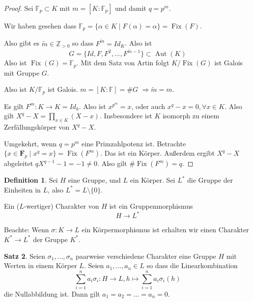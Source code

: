 \documentclass[12pt,parskip=full]{scrartcl}
\newcommand{\setZ}{\mathbb{Z}}
\theoremstyle{definition}
\newtheorem{theorem}{Satz}[section]
\newtheorem{definition}[theorem]{Definition}
\theoremstyle{remark}
\begin{document}
	\begin{proof}
		Sei $\mathbb{F}_p \subset K$ mit $m = [K: \mathbb{F}_p]$ und damit $q = p^m$.
		
		Wir haben gesehen dass $\mathbb{F}_p = \{ \alpha \in K \mid F(\alpha) = \alpha \} = \operatorname{Fix}(F)$.
		
		Also gibt es $\tilde{m} \in \setZ_{>0}$ so dass $F^{\tilde{m}} = Id_K$. Also ist
		\begin{equation*}
			G = \{ Id, F, F^2, \dots, F^{\tilde{m} - 1} \} \subset \operatorname{Aut}(K)
		\end{equation*}
		Also ist $\operatorname{Fix}(G) = \mathbb{F}_p$. Mit dem Satz von Artin folgt $K/\operatorname{Fix}(G)$ ist Galois mit Gruppe $G$.
		
		Also ist $K/\mathbb{F}_p$ ist Galois. $m = [K: \mathbb{F}] = \#G$ $\Rightarrow \tilde{m} = m$.
		
		Es gilt $F^m: K \to K = Id_k$. Also ist $x^{p^m} = x$, oder auch $x^q - x = 0, \forall x \in K$. Also gilt $X^q - X = \prod_{x \in K} (X - x)$. Insbesondere ist $K$ isomorph zu einem Zerfällungskörper von $X^q - X$.
		
		Umgekehrt, wenn $q = p^m$ eine Primzahlpotenz ist. Betrachte $\{ x \in \overline{\mathbf{F}_p} \mid x^q = x \} = \operatorname{Fix}(F^m)$. Das ist ein Körper. Außerdem ergibt $X^q - X$ abgeleitet $q X^{q-1} - 1 = -1 \neq 0$. Also gilt $\#\operatorname{Fix}(F^m) = q$.
	\end{proof}

	\begin{definition}
		Sei $H$ eine Gruppe, und $L$ ein Körper. Sei $L^*$ die Gruppe der Einheiten in $L$, also $L^* = L \setminus \{ 0 \}$.
		
		Ein ($L$-wertiger) Charakter von $H$ ist ein Gruppenmorphismus
		\begin{equation*}
			H \to L^*
		\end{equation*}
		
		Beachte: Wenn $\sigma: K \to L$ ein Körpermorphismus ist erhalten wir einen Charakter $K^* \to L^*$ der Gruppe $K^*$.
	\end{definition}

	\begin{theorem}
		Seien $\sigma_1, \dots, \sigma_n$ paarweise verschiedene Charakter eine Gruppe $H$ mit Werten in einem Körper $L$. Seien $a_1, \dots, a_n \in L$ so dass die Linearkombination
		\begin{equation*}
			\sum_{i = 1}^n a_i \sigma_i: H \to L, h \mapsto \sum_{i = 1}^n a_i \sigma_i(h)
		\end{equation*}
		die Nullabbildung ist. Dann gilt $a_1 = a_2 = \dots = a_n = 0$.
	\end{theorem}
\end{document}
